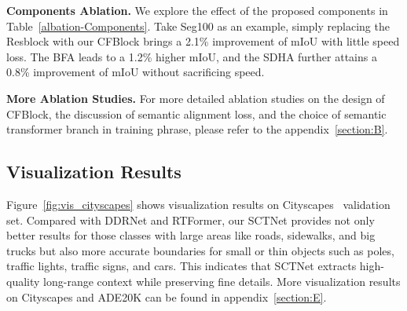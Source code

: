 \documentclass[letterpaper]{article} %
\begin{document}
\noindent
{\bf Components Ablation.}
We explore the effect of the proposed components in Table~\ref{albation-Components}. Take Seg100 as an example, simply replacing the Resblock with our CFBlock brings a 2.1\% improvement of mIoU with little speed loss. The BFA leads to a 1.2\% higher mIoU, and the SDHA further attains a 0.8\% improvement of mIoU without sacrificing speed.

\begin{table}
  \centering

  \caption{\textbf{Ablation studies on the components of SCTNet}}
  \label{albation-Components}
\end{table}

\noindent
{\bf More Ablation Studies.} For more detailed ablation studies on the design of CFBlock, the discussion of semantic alignment loss, and the choice of semantic transformer branch in training phrase, please refer to the appendix~\ref{section:B}.


\subsection{Visualization Results}
Figure~\ref{fig:vis_cityscapes} shows visualization results on Cityscapes~\cite{cordts2016cityscapes} validation set. Compared with DDRNet and RTFormer, our SCTNet provides not only better results for those classes with large areas like roads, sidewalks, and big trucks but also more accurate boundaries for small or thin objects such as poles, traffic lights, traffic signs, and cars. This indicates that SCTNet extracts high-quality long-range context while preserving fine details. More visualization results on Cityscapes and ADE20K can be found in appendix~\ref{section:E}.
\end{document}
